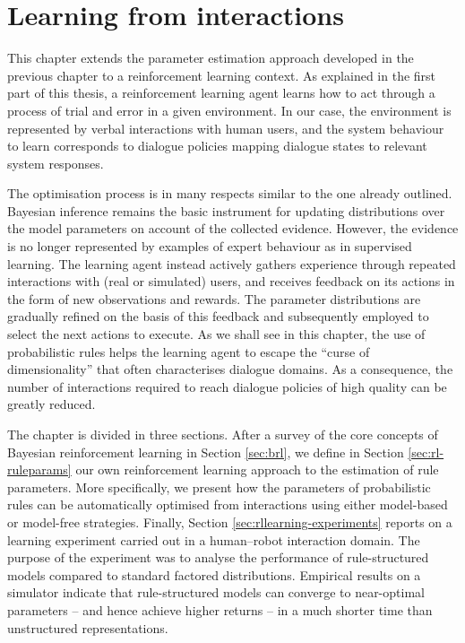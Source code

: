 \chapter{Learning from interactions}
\label{chap:rllearning}
This chapter extends the parameter estimation approach developed in the previous chapter to a reinforcement learning context.  As explained in the first part of this thesis, a reinforcement learning agent learns how to act through a process of trial and error in a given environment.  In our case, the environment is represented by verbal interactions with human users, and the system behaviour to learn corresponds to dialogue policies mapping dialogue states to relevant system responses. 

The optimisation process is in many respects similar to the one already outlined. Bayesian inference remains the basic instrument for updating distributions over the model parameters on account of the collected evidence.  However, the evidence is no longer represented by examples of expert behaviour as in supervised learning. The learning agent instead actively gathers experience through repeated interactions with (real or simulated) users, and receives feedback on its actions in the form of new observations and rewards. The parameter distributions are gradually refined on the basis of this feedback and subsequently employed to select the next actions to execute. As we shall see in this chapter, the use of probabilistic rules helps the learning agent to escape the ``curse of dimensionality'' that often characterises dialogue domains. As a consequence, the number of interactions required to reach dialogue policies of high quality can be greatly reduced. 

The chapter is divided in three sections.  After a survey of the core concepts of Bayesian reinforcement learning in Section \ref{sec:brl}, we define in Section \ref{sec:rl-ruleparams} our own reinforcement learning approach to the estimation of rule parameters.  More specifically, we present how the parameters of probabilistic rules can be automatically optimised from interactions using either model-based or model-free strategies. Finally, Section \ref{sec:rllearning-experiments} reports on a learning experiment carried out in a human--robot interaction domain. The purpose of the experiment was to analyse the performance of rule-structured models compared to standard factored distributions. Empirical results on a simulator indicate that rule-structured models can converge to near-optimal parameters -- and hence achieve higher returns -- in a much shorter time than unstructured representations. 

